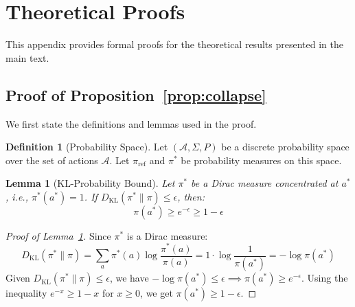 \documentclass{article}
\theoremstyle{plain}
\newtheorem{lemma}[theorem]{Lemma}
\theoremstyle{definition}
\newtheorem{definition}[theorem]{Definition}
\theoremstyle{remark}
\begin{document}
\section{Theoretical Proofs}
\label{app:proofs}

This appendix provides formal proofs for the theoretical results presented in the main text.

\subsection{Proof of Proposition~\ref{prop:collapse}}

We first state the definitions and lemmas used in the proof.

\begin{definition}[Probability Space]
Let $(\mathcal{A}, \Sigma, P)$ be a discrete probability space over the set of actions $\mathcal{A}$. Let $\pi_{\text{ref}}$ and $\pi^*$ be probability measures on this space.
\end{definition}

\begin{lemma}[KL-Probability Bound]
\label{lem:kl_bound}
Let $\pi^*$ be a Dirac measure concentrated at $a^*$, i.e., $\pi^*(a^*) = 1$. If $D_{\text{KL}}(\pi^* \| \pi) \le \epsilon$, then:
\begin{equation}
\pi(a^*) \ge e^{-\epsilon} \ge 1 - \epsilon
\end{equation}
\end{lemma}

\begin{proof}[Proof of Lemma~\ref{lem:kl_bound}]
Since $\pi^*$ is a Dirac measure:
\begin{equation}
D_{\text{KL}}(\pi^* \| \pi) = \sum_{a} \pi^*(a) \log \frac{\pi^*(a)}{\pi(a)} = 1 \cdot \log \frac{1}{\pi(a^*)} = -\log \pi(a^*)
\end{equation}
Given $D_{\text{KL}}(\pi^* \| \pi) \le \epsilon$, we have $-\log \pi(a^*) \le \epsilon \implies \pi(a^*) \ge e^{-\epsilon}$. Using the inequality $e^{-x} \ge 1-x$ for $x \ge 0$, we get $\pi(a^*) \ge 1 - \epsilon$.
\end{proof}
\end{document}
